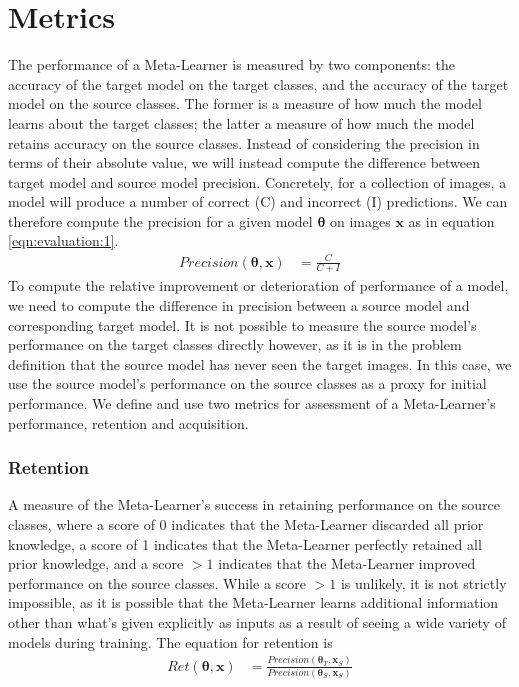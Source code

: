 \documentclass{report}
\begin{document}
\section{Metrics} \label{metrics}
The performance of a Meta-Learner is measured by two components: the accuracy of the target model on the target classes, and the accuracy of the target model on the source classes. The former is a measure of how much the model learns about the target classes; the latter a measure of how much the model retains accuracy on the source classes. Instead of considering the precision in terms of their absolute value, we will instead compute the difference between target model and source model precision. Concretely, for a collection of images, a model will produce a number of correct (C) and incorrect (I) predictions. We can therefore compute the precision for a given model $\bm{\theta}$ on images $\bm{x}$ as in equation \ref{eqn:evaluation:1}.
\begin{align} \label{eqn:evaluation:1}
Precision(\bm{\theta}, \bm{x}) &= \frac{C}{C+I}
\end{align}
To compute the relative improvement or deterioration of performance of a model, we need to compute the difference in precision between a source model and corresponding target model. It is not possible to measure the source model's performance on the target classes directly however, as it is in the problem definition that the source model has never seen the target images. In this case, we use the source model's performance on the source classes as a proxy for initial performance. We define and use two metrics for assessment of a Meta-Learner's performance, retention and acquisition.\par
\subsubsection{Retention}
A measure of the Meta-Learner's success in retaining performance on the source classes, where a score of 0 indicates that the Meta-Learner discarded all prior knowledge, a score of 1 indicates that the Meta-Learner perfectly retained all prior knowledge, and a score $>1$ indicates that the Meta-Learner improved performance on the source classes. While a score $>1$ is unlikely, it is not strictly impossible, as it is possible that the Meta-Learner learns additional information other than what's given explicitly as inputs as a result of seeing a wide variety of models during training. The equation for retention is 
\begin{align}
Ret(\bm{\theta}, \bm{x}) &= \frac{Precision(\bm{\theta}_T, \bm{x}_S)}{ Precision(\bm{\theta}_S, \bm{x}_S)}
\end{align}
\end{document}
